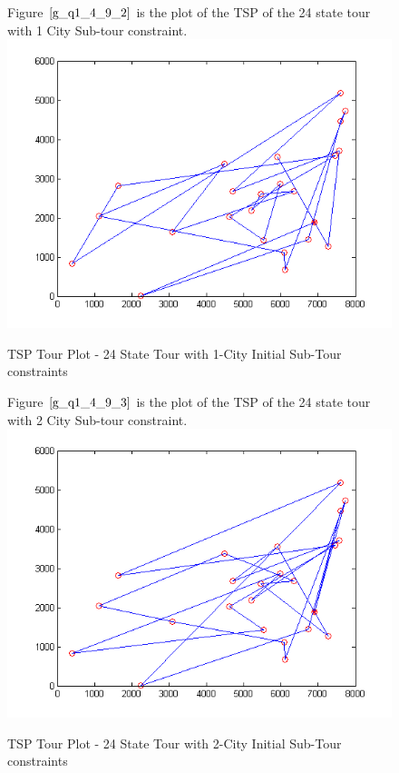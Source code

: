 \documentclass[twoside,12pt]{article}
\begin{document}
\begin{figure}[!htbp]
\centering
Figure $\eqref{g_q1_4_9_2}$ is the plot of the TSP of the 24 state tour with 1 City Sub-tour constraint. 
 \includegraphics[scale=1.3]{1_city/all_24_with_1} 
\caption{TSP Tour Plot - 24 State Tour with 1-City Initial Sub-Tour constraints}
\label{g_q1_4_9_2}
\end{figure}
\FloatBarrier

\begin{figure}[!htbp]
\centering
Figure $\eqref{g_q1_4_9_3}$ is the plot of the TSP of the 24 state tour with 2 City Sub-tour constraint. 
 \includegraphics[scale=1.3]{2_city/all_24_with_2} 
\caption{TSP Tour Plot - 24 State Tour with 2-City Initial Sub-Tour constraints}
\label{g_q1_4_9_3}
\end{figure}
\FloatBarrier
\end{document}
